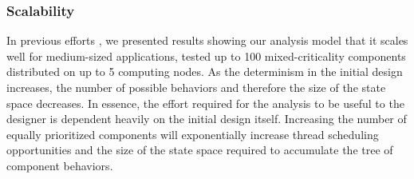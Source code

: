 \subsubsection{Scalability}
In previous efforts \cite{MoDeVVa}, we presented results showing our analysis model that it scales well for medium-sized applications, tested up to 100 mixed-criticality components distributed on up to 5 computing nodes. As the determinism in the initial design increases, the number of possible behaviors and therefore the size of the state space decreases. In essence, the effort required for the analysis to be useful to the designer is dependent heavily on the initial design itself. Increasing the number of equally prioritized components will exponentially increase thread scheduling opportunities and the size of the state space required to accumulate the tree of component behaviors.  %




